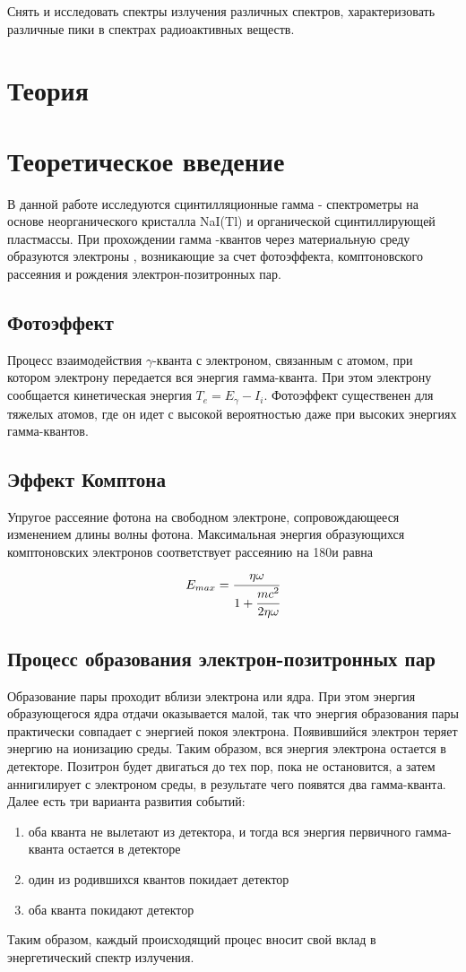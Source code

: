 \documentclass[14pt,a4paper]{scrartcl}
\begin{document}
Снять и исследовать спектры излучения различных спектров, характеризовать различные пики в спектрах радиоактивных веществ.


\section{Теория}


	\section{Теоретическое введение}
		В данной работе исследуются сцинтилляционные гамма - спектрометры на основе неорганического кристалла NaI(Tl) и органической сцинтиллирующей пластмассы. При прохождении гамма -квантов через материальную среду образуются электроны , возникающие за счет фотоэффекта,  комптоновского рассеяния и рождения  электрон-позитронных пар.
		\subsection{Фотоэффект}
		Процесс взаимодействия $\gamma$-кванта с электроном, связанным с атомом, при котором электрону передается вся энергия гамма-кванта. При этом электрону сообщается кинетическая энергия $T_e = E_\gamma - I_i$. Фотоэффект существенен для тяжелых атомов, где он идет с высокой вероятностью даже при высоких энергиях гамма-квантов.
		\subsection{Эффект Комптона}
		Упругое рассеяние фотона на свободном электроне, сопровождающееся изменением длины волны фотона. Максимальная энергия образующихся комптоновских электронов соответствует рассеянию на 180\degres и равна 
		\begin{equation}
		    E_{max} = \cfrac{\eta\omega}{1+\cfrac{mc^2}{2\eta\omega}}
		\end{equation}
		\subsection{Процесс образования электрон-позитронных пар}
		Образование пары проходит вблизи электрона или ядра. При этом энергия образующегося ядра отдачи оказывается малой, так что энергия образования пары практически совпадает с энергией покоя электрона. Появившийся электрон теряет энергию на ионизацию среды. Таким образом, вся энергия электрона остается в детекторе. Позитрон будет двигаться до тех пор, пока не остановится, а затем аннигилирует с электроном среды, в результате чего появятся два гамма-кванта. Далее есть три варианта развития событий:
		\begin{enumerate}
		    \item оба кванта не вылетают из детектора, и тогда вся энергия первичного гамма-кванта остается в детекторе
		    \item один из родившихся квантов покидает детектор
		    \item оба кванта покидают детектор
		\end{enumerate}
		Таким образом, каждый происходящий процес вносит свой вклад в энергетический спектр излучения.
		
\end{document}
